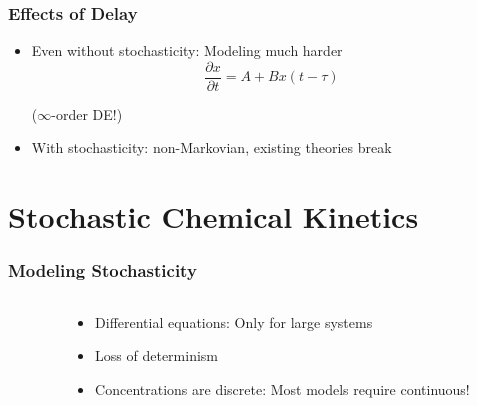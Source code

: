 \documentclass[xcolor={usenames,dvipsnames,svgnames},url=hyphens]{beamer}
\begin{document}
\begin{frame}
    \frametitle{Effects of Delay}
    \begin{itemize}
        \item Even without stochasticity: Modeling much harder\\
            \begin{equation*}
                \frac{\partial x}{\partial t} = A + B x(t - \tau)
            \end{equation*}

            \begin{center}
                ($\infty$-order DE!)
            \end{center}
        \item With stochasticity: non-Markovian, existing theories break
    \end{itemize}
\end{frame}


\section{Stochastic Chemical Kinetics} %
\label{sec:modeling}

\begin{frame}
    \frametitle{Modeling Stochasticity}
    \begin{columns}[c]
        \begin{column}{0.5\textwidth}
            \begin{center}
                \resizebox{\textwidth}{!}{
                    
                }
            \end{center}
        \end{column}
        \begin{column}{0.5\textwidth}
            \begin{itemize}
                \item Differential equations: Only for large systems
                \item Loss of determinism
                \item Concentrations are discrete: Most models require continuous!
            \end{itemize}
        \end{column}
    \end{columns}
\end{frame}
\end{document}
